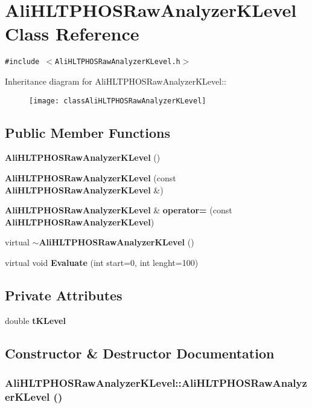 \section{Ali\-HLTPHOSRaw\-Analyzer\-KLevel Class Reference}
\label{classAliHLTPHOSRawAnalyzerKLevel}
{\tt \#include $<$Ali\-HLTPHOSRaw\-Analyzer\-KLevel.h$>$}

Inheritance diagram for Ali\-HLTPHOSRaw\-Analyzer\-KLevel::\begin{figure}[H]
\begin{center}
\leavevmode
\texttt{[image: classAliHLTPHOSRawAnalyzerKLevel]}
\end{center}
\end{figure}
\subsection*{Public Member Functions}
\begin{CompactItemize}
\item 
{\bf Ali\-HLTPHOSRaw\-Analyzer\-KLevel} ()
\item 
{\bf Ali\-HLTPHOSRaw\-Analyzer\-KLevel} (const {\bf Ali\-HLTPHOSRaw\-Analyzer\-KLevel} \&)
\item 
{\bf Ali\-HLTPHOSRaw\-Analyzer\-KLevel} \& {\bf operator=} (const {\bf Ali\-HLTPHOSRaw\-Analyzer\-KLevel})
\item 
virtual {\bf $\sim$Ali\-HLTPHOSRaw\-Analyzer\-KLevel} ()
\item 
virtual void {\bf Evaluate} (int start=0, int lenght=100)
\end{CompactItemize}
\subsection*{Private Attributes}
\begin{CompactItemize}
\item 
double {\bf t\-KLevel}
\end{CompactItemize}


\subsection{Constructor \& Destructor Documentation}
\subsubsection{\setlength{\rightskip}{0pt plus 5cm}Ali\-HLTPHOSRaw\-Analyzer\-KLevel::Ali\-HLTPHOSRaw\-Analyzer\-KLevel ()}\label{classAliHLTPHOSRawAnalyzerKLevel_a0}


